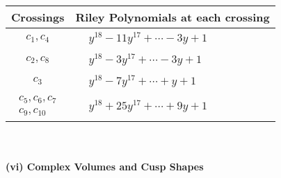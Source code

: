 \documentclass[1p]{elsarticle_modified}
\theoremstyle{definition}
\begin{document}
\begin{tabular}{m{50pt}|m{274pt}}
Crossings & \hspace{64pt}Riley Polynomials at each crossing \\
\hline $$\begin{aligned}c_{1},c_{4}\end{aligned}$$&$\begin{aligned}
&y^{18}-11 y^{17}+\cdots-3 y+1
\end{aligned}$\\
\hline $$\begin{aligned}c_{2},c_{8}\end{aligned}$$&$\begin{aligned}
&y^{18}-3 y^{17}+\cdots-3 y+1
\end{aligned}$\\
\hline $$\begin{aligned}c_{3}\end{aligned}$$&$\begin{aligned}
&y^{18}-7 y^{17}+\cdots+y+1
\end{aligned}$\\
\hline $$\begin{aligned}c_{5},c_{6},c_{7}\\c_{9},c_{10}\end{aligned}$$&$\begin{aligned}
&y^{18}+25 y^{17}+\cdots+9 y+1
\end{aligned}$\\
\hline
\end{tabular}\\~\\
\newpage\flushleft \textbf{(vi) Complex Volumes and Cusp Shapes}
\end{document}
